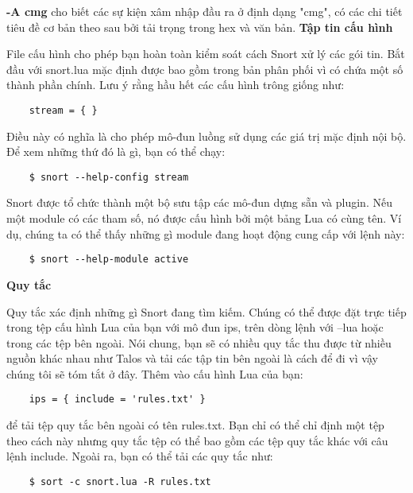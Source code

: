 \textbf{-A cmg} cho biết các sự kiện xâm nhập đầu ra ở định dạng "cmg", có các chi tiết tiêu đề cơ bản theo sau bởi tải trọng trong hex và văn bản.
\newline
\newline
\textbf{Tập tin cấu hình}
\par
File cấu hình cho phép bạn hoàn toàn kiểm soát cách Snort xử lý các gói tin. 
Bắt đầu với snort.lua mặc định được bao gồm trong bản phân phối vì có chứa một số thành phần chính. 
Lưu ý rằng hầu hết các cấu hình trông giống như:
\begin{lstlisting}
    stream = { }
\end{lstlisting}
Điều này có nghĩa là cho phép mô-đun luồng sử dụng các giá trị mặc định nội bộ. Để xem những thứ đó là gì, bạn có thể chạy:
\begin{lstlisting}
    $ snort --help-config stream
\end{lstlisting}
Snort được tổ chức thành một bộ sưu tập các mô-đun dựng sẵn và plugin. 
Nếu một module có các tham số, nó được cấu hình bởi một bảng Lua có cùng tên. 
Ví dụ, chúng ta có thể thấy những gì module đang hoạt động cung cấp với lệnh này:
\begin{lstlisting}
    $ snort --help-module active
\end{lstlisting}
\textbf{Quy tắc}
\par
Quy tắc xác định những gì Snort đang tìm kiếm. 
Chúng có thể được đặt trực tiếp trong tệp cấu hình Lua của bạn với mô đun ips, trên dòng lệnh với --lua hoặc trong các tệp bên ngoài. 
Nói chung, bạn sẽ có nhiều quy tắc thu được từ nhiều nguồn khác nhau như Talos và tải các tập tin bên ngoài là cách để đi vì vậy chúng tôi sẽ tóm tắt ở đây. 
Thêm vào cấu hình Lua của bạn:
\begin{lstlisting}
    ips = { include = 'rules.txt' }
\end{lstlisting}
để tải tệp quy tắc bên ngoài có tên rules.txt. 
Bạn chỉ có thể chỉ định một tệp theo cách này nhưng quy tắc tệp có thể bao gồm các tệp quy tắc khác với câu lệnh include. Ngoài ra, bạn có thể tải các quy tắc như:
\begin{lstlisting}
    $ sort -c snort.lua -R rules.txt
\end{lstlisting}
